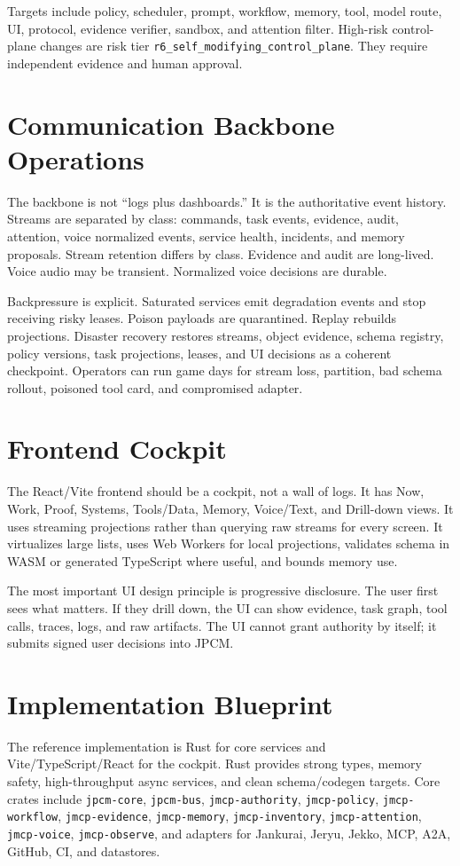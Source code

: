 \documentclass[10pt,journal,onecolumn]{IEEEtran}
\begin{document}
Targets include policy, scheduler, prompt, workflow, memory, tool, model route, UI, protocol, evidence verifier, sandbox, and attention filter. High-risk control-plane changes are risk tier \texttt{r6\_self\_modifying\_control\_plane}. They require independent evidence and human approval.

\section{Communication Backbone Operations}
The backbone is not ``logs plus dashboards.'' It is the authoritative event history. Streams are separated by class: commands, task events, evidence, audit, attention, voice normalized events, service health, incidents, and memory proposals. Stream retention differs by class. Evidence and audit are long-lived. Voice audio may be transient. Normalized voice decisions are durable.

Backpressure is explicit. Saturated services emit degradation events and stop receiving risky leases. Poison payloads are quarantined. Replay rebuilds projections. Disaster recovery restores streams, object evidence, schema registry, policy versions, task projections, leases, and UI decisions as a coherent checkpoint. Operators can run game days for stream loss, partition, bad schema rollout, poisoned tool card, and compromised adapter.

\section{Frontend Cockpit}
The React/Vite frontend should be a cockpit, not a wall of logs. It has Now, Work, Proof, Systems, Tools/Data, Memory, Voice/Text, and Drill-down views. It uses streaming projections rather than querying raw streams for every screen. It virtualizes large lists, uses Web Workers for local projections, validates schema in WASM or generated TypeScript where useful, and bounds memory use.

The most important UI design principle is progressive disclosure. The user first sees what matters. If they drill down, the UI can show evidence, task graph, tool calls, traces, logs, and raw artifacts. The UI cannot grant authority by itself; it submits signed user decisions into JPCM.

\section{Implementation Blueprint}
The reference implementation is Rust for core services and Vite/TypeScript/React for the cockpit. Rust provides strong types, memory safety, high-throughput async services, and clean schema/codegen targets. Core crates include \texttt{jpcm-core}, \texttt{jpcm-bus}, \texttt{jmcp-authority}, \texttt{jmcp-policy}, \texttt{jmcp-workflow}, \texttt{jmcp-evidence}, \texttt{jmcp-memory}, \texttt{jmcp-inventory}, \texttt{jmcp-attention}, \texttt{jmcp-voice}, \texttt{jmcp-observe}, and adapters for Jankurai, Jeryu, Jekko, MCP, A2A, GitHub, CI, and datastores.
\end{document}
